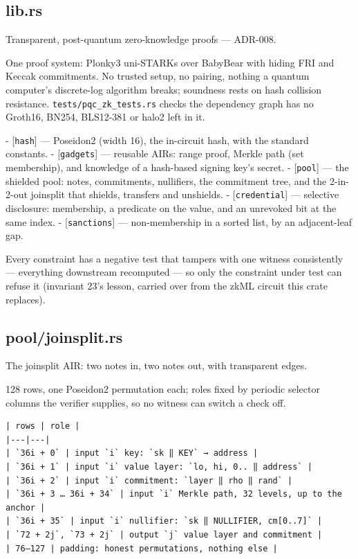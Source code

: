 \documentclass[11pt,a4paper]{article}
\begin{document}
\subsection{lib.rs}
Transparent, post-quantum zero-knowledge proofs — ADR-008.

One proof system: Plonky3 uni-STARKs over BabyBear with hiding FRI and
Keccak commitments. No trusted setup, no pairing, nothing a quantum
computer's discrete-log algorithm breaks; soundness rests on hash
collision resistance. \texttt{tests/pqc\_zk\_tests.rs} checks the dependency graph
has no Groth16, BN254, BLS12-381 or halo2 left in it.

- [\texttt{hash}] — Poseidon2 (width 16), the in-circuit hash, with the standard
  constants.
- [\texttt{gadgets}] — reusable AIRs: range proof, Merkle path (set membership),
  and knowledge of a hash-based signing key's secret.
- [\texttt{pool}] — the shielded pool: notes, commitments, nullifiers, the
  commitment tree, and the 2-in-2-out joinsplit that shields, transfers
  and unshields.
- [\texttt{credential}] — selective disclosure: membership, a predicate on the
  value, and an unrevoked bit at the same index.
- [\texttt{sanctions}] — non-membership in a sorted list, by an adjacent-leaf gap.

Every constraint has a negative test that tampers with one witness
consistently — everything downstream recomputed — so only the constraint
under test can refuse it (invariant 23's lesson, carried over from the
zkML circuit this crate replaces).

\subsection{pool/joinsplit.rs}
The joinsplit AIR: two notes in, two notes out, with transparent edges.

128 rows, one Poseidon2 permutation each; roles fixed by periodic selector
columns the verifier supplies, so no witness can switch a check off.

\begin{verbatim}
| rows | role |
|---|---|
| `36i + 0` | input `i` key: `sk ‖ KEY` → address |
| `36i + 1` | input `i` value layer: `lo, hi, 0.. ‖ address` |
| `36i + 2` | input `i` commitment: `layer ‖ rho ‖ rand` |
| `36i + 3 … 36i + 34` | input `i` Merkle path, 32 levels, up to the anchor |
| `36i + 35` | input `i` nullifier: `sk ‖ NULLIFIER, cm[0..7]` |
| `72 + 2j`, `73 + 2j` | output `j` value layer and commitment |
| 76–127 | padding: honest permutations, nothing else |
\end{verbatim}
\end{document}
